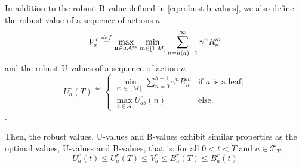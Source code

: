 \documentclass{article}
\begin{document}
\begin{lemma}
	In addition to the robust B-value defined in \eqref{eq:robust-b-values}, we also define the robust value of a sequence of actions $a$
	\begin{equation}
	\label{eq:max_vr}
	V_a^r \stackrel{def}{=} \max_{\mathbf{u} \in a\mathcal{A^\infty}} \min_{m\in[1, M]} \sum_{n=h(a)+1}^\infty \gamma^n R^m_n
	\end{equation}
	and the robust U-values of a sequence of action $a$
	\begin{equation}
	\label{eq:ur}
	U_a^r(T)  \eqdef
	\begin{cases}
	\min_{m\in[M]} \sum_{n=0}^{h-1} \gamma^n R_n^m &\text{if } a \text{ is a leaf;}\\
	\max_{b\in\mathcal{A}} U_{ab}^r(n) & \text{else.}
	\end{cases}
	\end{equation}.
	
	Then, the robust values, U-values and B-values exhibit similar properties as the optimal values, U-values and B-values, that is: for all $0 < t < T$ and $a\in\mathcal{T}_T$,
	\begin{equation}
	U^r_a(t) \leq U^r_a(T) \leq V^r_a \leq B^r_a(T) \leq B^r_a(t)
	\end{equation}
	\label{lemma:uvb}
\end{lemma}
\end{document}
